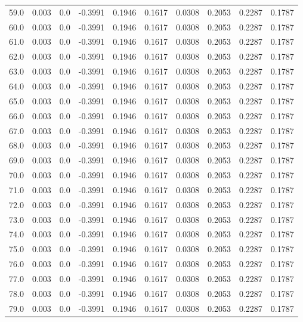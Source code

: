 \begin{longtable}{lrrrrrrrrr}
59.0 & 0.003 & 0.0 & -0.3991 & 0.1946 & 0.1617 & 0.0308 & 0.2053 & 0.2287 & 0.1787 \\
60.0 & 0.003 & 0.0 & -0.3991 & 0.1946 & 0.1617 & 0.0308 & 0.2053 & 0.2287 & 0.1787 \\
61.0 & 0.003 & 0.0 & -0.3991 & 0.1946 & 0.1617 & 0.0308 & 0.2053 & 0.2287 & 0.1787 \\
62.0 & 0.003 & 0.0 & -0.3991 & 0.1946 & 0.1617 & 0.0308 & 0.2053 & 0.2287 & 0.1787 \\
63.0 & 0.003 & 0.0 & -0.3991 & 0.1946 & 0.1617 & 0.0308 & 0.2053 & 0.2287 & 0.1787 \\
64.0 & 0.003 & 0.0 & -0.3991 & 0.1946 & 0.1617 & 0.0308 & 0.2053 & 0.2287 & 0.1787 \\
65.0 & 0.003 & 0.0 & -0.3991 & 0.1946 & 0.1617 & 0.0308 & 0.2053 & 0.2287 & 0.1787 \\
66.0 & 0.003 & 0.0 & -0.3991 & 0.1946 & 0.1617 & 0.0308 & 0.2053 & 0.2287 & 0.1787 \\
67.0 & 0.003 & 0.0 & -0.3991 & 0.1946 & 0.1617 & 0.0308 & 0.2053 & 0.2287 & 0.1787 \\
68.0 & 0.003 & 0.0 & -0.3991 & 0.1946 & 0.1617 & 0.0308 & 0.2053 & 0.2287 & 0.1787 \\
69.0 & 0.003 & 0.0 & -0.3991 & 0.1946 & 0.1617 & 0.0308 & 0.2053 & 0.2287 & 0.1787 \\
70.0 & 0.003 & 0.0 & -0.3991 & 0.1946 & 0.1617 & 0.0308 & 0.2053 & 0.2287 & 0.1787 \\
71.0 & 0.003 & 0.0 & -0.3991 & 0.1946 & 0.1617 & 0.0308 & 0.2053 & 0.2287 & 0.1787 \\
72.0 & 0.003 & 0.0 & -0.3991 & 0.1946 & 0.1617 & 0.0308 & 0.2053 & 0.2287 & 0.1787 \\
73.0 & 0.003 & 0.0 & -0.3991 & 0.1946 & 0.1617 & 0.0308 & 0.2053 & 0.2287 & 0.1787 \\
74.0 & 0.003 & 0.0 & -0.3991 & 0.1946 & 0.1617 & 0.0308 & 0.2053 & 0.2287 & 0.1787 \\
75.0 & 0.003 & 0.0 & -0.3991 & 0.1946 & 0.1617 & 0.0308 & 0.2053 & 0.2287 & 0.1787 \\
76.0 & 0.003 & 0.0 & -0.3991 & 0.1946 & 0.1617 & 0.0308 & 0.2053 & 0.2287 & 0.1787 \\
77.0 & 0.003 & 0.0 & -0.3991 & 0.1946 & 0.1617 & 0.0308 & 0.2053 & 0.2287 & 0.1787 \\
78.0 & 0.003 & 0.0 & -0.3991 & 0.1946 & 0.1617 & 0.0308 & 0.2053 & 0.2287 & 0.1787 \\
79.0 & 0.003 & 0.0 & -0.3991 & 0.1946 & 0.1617 & 0.0308 & 0.2053 & 0.2287 & 0.1787 \\

\end{longtable}
